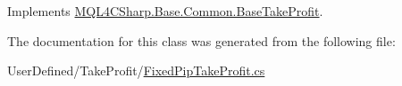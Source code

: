 Implements \hyperlink{class_m_q_l4_c_sharp_1_1_base_1_1_common_1_1_base_take_profit_a10176a6634bf9f2a3c849d2be013356c}{M\+Q\+L4\+C\+Sharp.\+Base.\+Common.\+Base\+Take\+Profit}.



The documentation for this class was generated from the following file\+:\begin{DoxyCompactItemize}
\item 
User\+Defined/\+Take\+Profit/\hyperlink{_fixed_pip_take_profit_8cs}{Fixed\+Pip\+Take\+Profit.\+cs}\end{DoxyCompactItemize}
